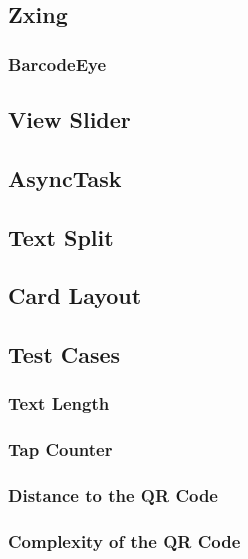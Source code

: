 \subsection{Zxing}


\subsubsection{BarcodeEye}


\subsection{View Slider}


\subsection{AsyncTask}


\subsection{Text Split}


\subsection{Card Layout}


\subsection{Test Cases}


\subsubsection{Text Length}


\subsubsection{Tap Counter}


\subsubsection{Distance to the QR Code}


\subsubsection{Complexity of the QR Code}


